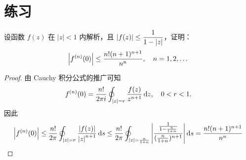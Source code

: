 \documentclass[12pt, a4paper, oneside, UTF8]{ctexbook}
\begin{document}
\section{练习}
\begin{exercise}
    设函数 $f(z)$ 在 $|z|<1$ 内解析，且 $\abs{f(z)}\le \dfrac{1}{1-\abs{z}}$，证明：
    \[\abs{f^{(n)}(0)}\le \frac{n!(n+1)^{n+1}}{n^n},\quad n=1,2,\dots\]
\end{exercise}
\begin{proof}
    
    由 Cauchy 积分公式的推广可知
    \[
    f^{(n)}(0) = \frac{n!}{2\pi i}\oint_{\abs{z}=r}\frac{f(z)}{z^{n+1}}\,\mathrm{d} z,\quad 0<r<1.
    \]
    因此
    \[
    \abs{f^{(n)}(0)} \le \frac{n!}{2\pi}\oint_{\abs{z}=r}\frac{\abs{f(z)}}{\abs{z}^{n+1}}\,\mathrm{d} s \le 
    \frac{n!}{2\pi}\oint_{\abs{z}=\frac{n}{1+n}}\abs{\frac{\frac{1}{1-\frac{n}{1+n}}}{(\frac{n}{1+n})^{n+1}}}\,\mathrm{d} s = \frac{n!(n+1)^{n+1}}{n^n}
    \]
\end{proof}
\ifx\allfiles\undefined
\end{document}
